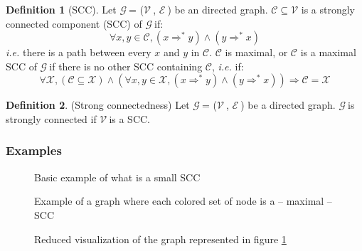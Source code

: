 \documentclass[a4 paper, 12pt]{article}
\theoremstyle{definition}
\def\GG{$\mathcal{G}~$}
\def\VV{$\mathcal{V}~$}
\def\EE{$\mathcal{E}~$}
\newtheorem{definition}{Definition}
\begin{document}
\begin{definition}[SCC]
    Let \GG = (\VV, \EE) be an directed graph.
$\mathcal{C} \subseteq \mathcal{V}$ is a strongly connected component (SCC) of \GG if:
\begin{equation*}
    \forall x, y \in \mathcal{C}, (x \Rightarrow^* y) \wedge (y \Rightarrow^* x)
\end{equation*}
\textit{i.e.} there is a path between every $x$ and $y$ in $\mathcal{C}$.
\BlankLine
$\mathcal{C}$ is maximal, or $\mathcal{C}$ is a maximal SCC of \GG if there is no other SCC containing $\mathcal{C}$, \textit{i.e.} if:
\begin{equation*}
    \forall \mathcal{X}, (\mathcal{C} \subseteq \mathcal{X}) \wedge (\forall x, y \in \mathcal{X}, (x \Rightarrow^* y) \wedge (y \Rightarrow^* x)) \Longrightarrow \mathcal{C} = \mathcal{X}
\end{equation*}
\end{definition}

\begin{definition}(Strong connectedness)
Let \GG = (\VV, \EE) be a directed graph. \GG is strongly connected if \VV is a SCC.
\end{definition}

\subsubsection{Examples}
\begin{figure}[!h]
    \centering
    \begin{subfigure}[t]{.49\textwidth}
    \end{subfigure}
    \begin{subfigure}[t]{.49\textwidth}
    \end{subfigure}
    \caption{Basic example of what is a small SCC}
\end{figure}
\begin{figure}[!h]
    \caption{Example of a graph where each colored set of node is a -- maximal -- SCC\label{fig:exampleSCC}}
\end{figure}

\begin{figure}[!h]
    \caption{Reduced visualization of the graph represented in figure \ref{fig:exampleSCC}}
\end{figure}
\end{document}

